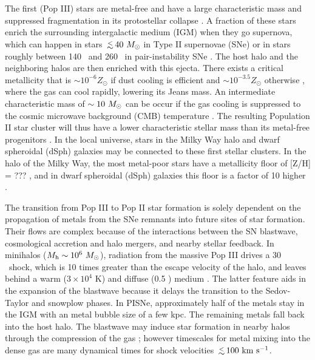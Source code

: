 \documentclass[apjl]{emulateapj}
\begin{document}
The first (Pop III) stars are metal-free and have a large
characteristic mass and suppressed fragmentation in its protostellar
collapse \citep{refs}.  A fraction of these stars enrich the
surrounding intergalactic medium (IGM) when they go supernova, which
can happen in stars $\lsim40~\Ms$ in Type II supernovae (SNe) or in
stars roughly between 140 \Ms~and 260 \Ms~in pair-instability SNe
\citep[PISNe;][]{Heger02}.  The host halo and the neighboring halos
are then enriched with this ejecta.  There exists a critical
metallicity that is $\sim 10^{-6} Z_\odot$ if dust cooling is
efficient \citep{refs} and $\sim 10^{-3.5} Z_\odot$ otherwise
\citep{refs}, where the gas can cool rapidly, lowering its Jeans mass.
An intermediate characteristic mass of $\sim10~\Ms$ can be occur if
the gas cooling is suppressed to the cosmic microwave background (CMB)
temperature \citep{ref}.  The resulting Population II star cluster
will thus have a lower characteristic stellar mass than its metal-free
progenitors \citep{refs}.  In the local universe, stars in the Milky
Way halo and dwarf spheroidal (dSph) galaxies may be connected to
these first stellar clusters.  In the halo of the Milky Way, the most
metal-poor stars have a metallicity floor of [Z/H] = ??? \citep{ref},
and in dwarf spheroidal (dSph) galaxies this floor is a factor of 10
higher \citep{refs}.

The transition from Pop III to Pop II star formation is solely
dependent on the propagation of metals from the SNe remnants into
future sites of star formation.  Their flows are complex because of
the interactions between the SN blastwave, cosmological accretion and
halo mergers, and nearby stellar feedback.  In minihalos ($M_{\rm h}
\sim 10^6~\Ms$), radiation from the massive Pop III drives a 30
\kms~shock, which is 10 times greater than the escape velocity of the
halo, and leaves behind a warm ($3 \times 10^4$ K) and diffuse (0.5
\cubecm) medium \citep{refs}.  The latter feature aids in the
expansion of the blastwave because it delays the transition to the
Sedov-Taylor and snowplow phases.  In PISNe, approximately half of the
metals stay in the IGM with an metal bubble size of a few kpc.  The
remaining metals fall back into the host halo.  The blastwave may
induce star formation in nearby halos through the compression of the
gas \citep{refs}; however timescales for metal mixing into the dense
gas are many dynamical times \citep{refs} for shock velocities $\lsim
100~\kms$.
\end{document}

